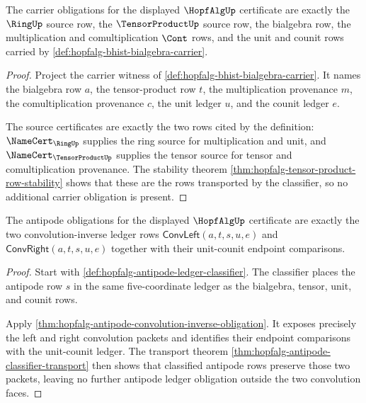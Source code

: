 \begin{theorem}
\label{thm:hopfalg-bialgebra-obligation-inventory}
The carrier obligations for the displayed $\HopfAlgUp$ certificate are exactly
the $\RingUp$ source row, the $\TensorProductUp$ source row, the bialgebra row,
the multiplication and comultiplication $\Cont$ rows, and the unit and counit
rows carried by \autoref{def:hopfalg-bhist-bialgebra-carrier}.
\end{theorem}
\begin{proof}
Project the carrier witness of \autoref{def:hopfalg-bhist-bialgebra-carrier}.
It names the bialgebra row $a$, the tensor-product row $t$, the multiplication
provenance $m$, the comultiplication provenance $c$, the unit ledger $u$, and
the counit ledger $e$.

The source certificates are exactly the two rows cited by the definition:
$\NameCert_{\RingUp}$ supplies the ring source for multiplication and unit, and
$\NameCert_{\TensorProductUp}$ supplies the tensor source for tensor and
comultiplication provenance. The stability theorem
\autoref{thm:hopfalg-tensor-product-row-stability} shows that these are the
rows transported by the classifier, so no additional carrier obligation is
present.
\end{proof}

\begin{theorem}
\label{thm:hopfalg-antipode-ledger-obligation}
The antipode obligations for the displayed $\HopfAlgUp$ certificate are exactly
the two convolution-inverse ledger rows
$\mathsf{ConvLeft}(a,t,s,u,e)$ and $\mathsf{ConvRight}(a,t,s,u,e)$ together
with their unit-counit endpoint comparisons.
\end{theorem}
\begin{proof}
Start with \autoref{def:hopfalg-antipode-ledger-classifier}. The classifier
places the antipode row $s$ in the same five-coordinate ledger as the
bialgebra, tensor, unit, and counit rows.

Apply \autoref{thm:hopfalg-antipode-convolution-inverse-obligation}. It
exposes precisely the left and right convolution packets and identifies their
endpoint comparisons with the unit-counit ledger. The transport theorem
\autoref{thm:hopfalg-antipode-classifier-transport} then shows that classified
antipode rows preserve those two packets, leaving no further antipode ledger
obligation outside the two convolution faces.
\end{proof}

